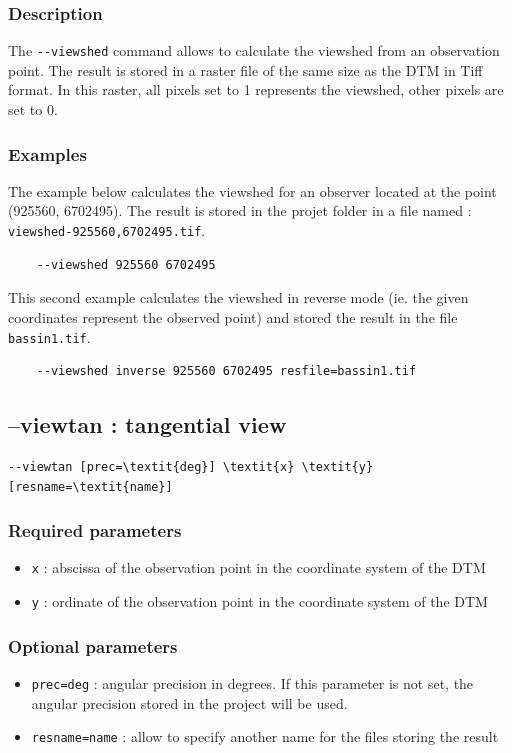 \documentclass{report}
\begin{document}
\subsubsection{Description}
The \verb|--viewshed| command allows to calculate the viewshed from an observation point.
The result is stored in a raster file of the same size as the DTM in Tiff format. 
In this raster, all pixels set to 1 represents the viewshed, other pixels are set to 0.

\subsubsection{Examples}
The example below calculates the viewshed for an observer located at the point (925560, 6702495). The result is stored in the projet folder in a file named : \verb|viewshed-925560,6702495.tif|.
\begin{Verbatim}
	--viewshed 925560 6702495
\end{Verbatim}

This second example calculates the viewshed in reverse mode (ie. the given coordinates represent the observed point) and stored the result in the file \verb|bassin1.tif|.
\begin{Verbatim}
	--viewshed inverse 925560 6702495 resfile=bassin1.tif
\end{Verbatim}

\subsection{--viewtan : tangential view}
\begin{Verbatim}[commandchars=\\\{\}]
--viewtan [prec=\textit{deg}] \textit{x} \textit{y} [resname=\textit{name}]
\end{Verbatim}

\subsubsection{Required parameters}
\begin{itemize}
	\item \verb|x| : abscissa of the observation point in the coordinate system of the DTM
	\item \verb|y| : ordinate of the observation point in the coordinate system of the DTM
\end{itemize}

\subsubsection{Optional parameters}
\begin{itemize}
	\item \verb|prec=deg| : angular precision in degrees. If this parameter is not set, the angular precision stored in the project will be used.
	\item \verb|resname=name| : allow to specify another name for the files storing the result
\end{itemize}
\end{document}
